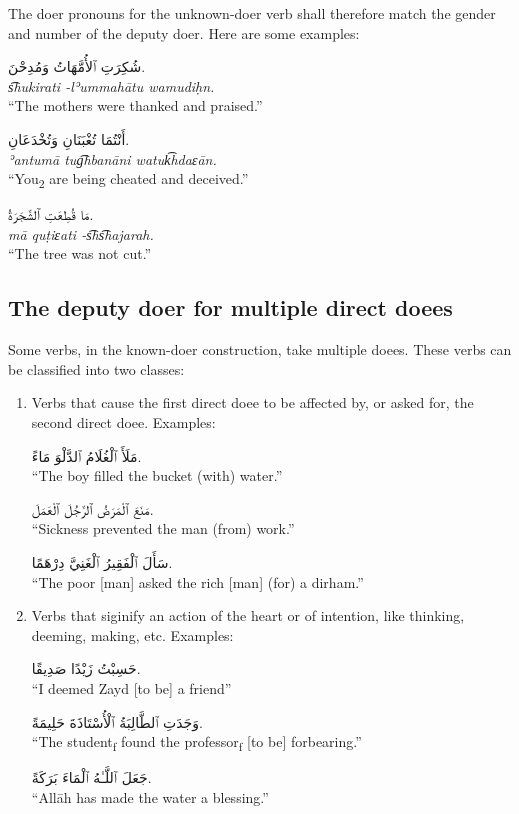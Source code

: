 \documentclass[
  10pt,
]{book}
\begin{document}
The doer pronouns for the unknown-doer verb shall therefore match the gender and number of the deputy doer. Here are some examples:

\foreignlanguage{arabic}{شُکِرَتِ ٱلأُمَّهَاتُ وَمُدِحْنَ.}\\
\emph{s͡hukirati -lʾummahātu wamudiḥn.}\\
\enquote{The mothers were thanked and praised.}

\foreignlanguage{arabic}{أَنْتُمَا تُغْبَنَانِ وَتُخْدَعَانِ.}\\
\emph{ʾantumā tug͡hbanāni watuk͡hdaɛān.}\\
\enquote{You\textsubscript{2} are being cheated and deceived.}

\foreignlanguage{arabic}{مَا قُطِعَتِ ٱلشَّجَرَةُ.}\\
\emph{mā quṭiɛati -s͡hs͡hajarah.}\\
\enquote{The tree was not cut.}

\subsection{The deputy doer for multiple direct doees}\label{the-deputy-doer-for-multiple-direct-doees}

Some verbs, in the known-doer construction, take multiple doees. These verbs can be classified into two classes:

\begin{enumerate}
\def\labelenumi{\alph{enumi}.}
\item
  Verbs that cause the first direct doee to be affected by, or asked for, the second direct doee. Examples:

  \foreignlanguage{arabic}{مَلَأَ ٱلْغُلَامُ ٱلدَّلْوَ مَاءً.}\\
  \enquote{The boy filled the bucket (with) water.}

  \foreignlanguage{arabic}{مَنَعَ ٱلْمَرَضُ ٱلرَّجُلَ ٱلْعَمَلَ.}\\
  \enquote{Sickness prevented the man (from) work.}

  \foreignlanguage{arabic}{سَأَلَ ٱلْفَقِيرُ ٱلْغَنِيَّ دِرْهَمًا.}\\
  \enquote{The poor {[}man{]} asked the rich {[}man{]} (for) a dirham.}
\item
  Verbs that siginify an action of the heart or of intention, like thinking, deeming, making, etc. Examples:

  \foreignlanguage{arabic}{حَسِبْتُ زَيْدًا صَدِيقًا.}\\
  \enquote{I deemed Zayd {[}to be{]} a friend}

  \foreignlanguage{arabic}{وَجَدَتِ ٱلطَّالِبَةُ ٱلْأُسْتَاذَةَ حَلِيمَةً.}\\
  \enquote{The student\textsubscript{f} found the professor\textsubscript{f} {[}to be{]} forbearing.}

  \foreignlanguage{arabic}{جَعَلَ ٱللَّـٰهُ ٱلْمَاءَ بَرَکَةً.}\\
  \enquote{Allāh has made the water a blessing.}
\end{enumerate}
\end{document}
